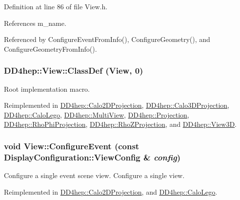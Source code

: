 Definition at line 86 of file View.h.

References m\_\-name.

Referenced by ConfigureEventFromInfo(), ConfigureGeometry(), and ConfigureGeometryFromInfo().\hypertarget{class_d_d4hep_1_1_view_a35dcb8a29c90f0adeba81ad4215be551}{
\subsubsection[{ClassDef}]{\setlength{\rightskip}{0pt plus 5cm}DD4hep::View::ClassDef ({\bf View}, \/  0)}}
\label{class_d_d4hep_1_1_view_a35dcb8a29c90f0adeba81ad4215be551}


Root implementation macro. 

Reimplemented in \hyperlink{class_d_d4hep_1_1_calo2_d_projection_a27b84375acec854d3c3fedba3519b7f4}{DD4hep::Calo2DProjection}, \hyperlink{class_d_d4hep_1_1_calo3_d_projection_a4696a6c764ceaf1307e6459c24cd7d1f}{DD4hep::Calo3DProjection}, \hyperlink{class_d_d4hep_1_1_calo_lego_a1a4c9c092acfa08adb65b7fe594fa7fd}{DD4hep::CaloLego}, \hyperlink{class_d_d4hep_1_1_multi_view_ae1b4bd4c3527dfe174acada259e6514c}{DD4hep::MultiView}, \hyperlink{class_d_d4hep_1_1_projection_a32d78dc00500fcb000ce25052c96fd62}{DD4hep::Projection}, \hyperlink{class_d_d4hep_1_1_rho_phi_projection_a33fb99400480c317f4e4d9fabf48836c}{DD4hep::RhoPhiProjection}, \hyperlink{class_d_d4hep_1_1_rho_z_projection_aef14a29e5037f6ac2df7eb09a8fa6c84}{DD4hep::RhoZProjection}, and \hyperlink{class_d_d4hep_1_1_view3_d_af7a20e27b1a1a86cd76af61d17167172}{DD4hep::View3D}.\hypertarget{class_d_d4hep_1_1_view_a655dc004a93ab9caa56ee5a501bf492f}{
\subsubsection[{ConfigureEvent}]{\setlength{\rightskip}{0pt plus 5cm}void View::ConfigureEvent (const {\bf DisplayConfiguration::ViewConfig} \& {\em config})}}
\label{class_d_d4hep_1_1_view_a655dc004a93ab9caa56ee5a501bf492f}


Configure a single event scene view. Configure a single view. 

Reimplemented in \hyperlink{class_d_d4hep_1_1_calo2_d_projection_ab49fa4071160750bd2c82e68b2f6d524}{DD4hep::Calo2DProjection}, and \hyperlink{class_d_d4hep_1_1_calo_lego_a997e3fea32d37374ef4c6c95e087af9c}{DD4hep::CaloLego}.

